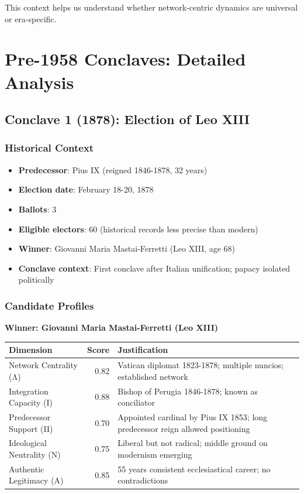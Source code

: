 This context helps us understand whether network-centric dynamics are universal or era-specific.


\section{Pre-1958 Conclaves: Detailed Analysis}

\subsection{Conclave 1 (1878): Election of Leo XIII}

\subsubsection{Historical Context}

\begin{itemize}
    \item \textbf{Predecessor}: Pius IX (reigned 1846-1878, 32 years)
    \item \textbf{Election date}: February 18-20, 1878
    \item \textbf{Ballots}: 3
    \item \textbf{Eligible electors}: 60 (historical records less precise than modern)
    \item \textbf{Winner}: Giovanni Maria Mastai-Ferretti (Leo XIII, age 68)
    \item \textbf{Conclave context}: First conclave after Italian unification; papacy isolated politically
\end{itemize}

\subsubsection{Candidate Profiles}

\textbf{Winner: Giovanni Maria Mastai-Ferretti (Leo XIII)}

\begin{center}
\begin{tabular}{lrp{4cm}}
\toprule
\textbf{Dimension} & \textbf{Score} & \textbf{Justification} \\
\midrule
Network Centrality (Λ) & 0.82 & Vatican diplomat 1823-1878; multiple nuncios; established network \\
Integration Capacity (Ι) & 0.88 & Bishop of Perugia 1846-1878; known as conciliator \\
Predecessor Support (Π) & 0.70 & Appointed cardinal by Pius IX 1853; long predecessor reign allowed positioning \\
Ideological Neutrality (Ν) & 0.75 & Liberal but not radical; middle ground on modernism emerging \\
Authentic Legitimacy (Α) & 0.85 & 55 years consistent ecclesiastical career; no contradictions \\
\bottomrule
\end{tabular}
\end{center}

